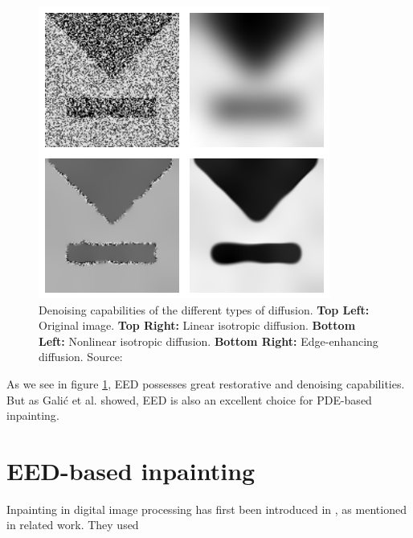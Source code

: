 \begin{figure}
    \centering
    \includegraphics[width=0.8\linewidth]{../Images/diff_examples.png}
    \caption{Denoising capabilities of the different types of diffusion. \textbf{Top Left:} Original
    image. \textbf{Top Right:} Linear isotropic diffusion. \textbf{Bottom Left:} Nonlinear
isotropic diffusion. \textbf{Bottom Right:} Edge-enhancing diffusion. Source:
\cite{weickert96}}\label{fig:DiffExamples}
\end{figure}
As we see in figure \ref{fig:DiffExamples}, EED possesses great restorative and denoising
capabilities. But as Galić et al. showed, EED is also an excellent choice for
PDE-based inpainting\cite{galic05}.
\section{EED-based inpainting}
Inpainting in digital image processing has first been introduced in \cite{bertalmio00}, as
mentioned in related work. They used 
